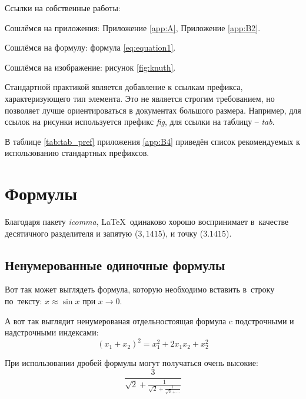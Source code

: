%

Ссылки на собственные работы:~\cite{vakbib1, confbib1}

Сошлёмся на приложения: Приложение \ref{app:A}, Приложение \ref{app:B2}.

Сошлёмся на формулу: формула \eqref{eq:equation1}.

Сошлёмся на изображение: рисунок \ref{fig:knuth}.

Стандартной практикой является добавление к ссылкам префикса, характеризующего тип элемента.
Это не является строгим требованием, но позволяет лучше ориентироваться в документах большого размера.
Например, для ссылок на рисунки используется префикс \textit{fig},
для ссылки на таблицу -- \textit{tab}.

В таблице \ref{tab:tab_pref} приложения \ref{app:B4} приведён список рекомендуемых
к использованию стандартных префиксов.

\section{Формулы} \label{sec:ch1/sec3}

Благодаря пакету \textit{icomma}, \LaTeX~одинаково хорошо воспринимает
в~качестве десятичного разделителя и запятую ($3,1415$), и точку ($3.1415$).

\subsection{Ненумерованные одиночные формулы} \label{subsec:ch1/sec3/sub1}

Вот так может выглядеть формула, которую необходимо вставить в~строку
по~тексту: $x \approx \sin x$ при $x \to 0$.

А вот так выглядит ненумерованая отдельностоящая формула c подстрочными
и надстрочными индексами:
\[
(x_1+x_2)^2 = x_1^2 + 2 x_1 x_2 + x_2^2
\]

При использовании дробей формулы могут получаться очень высокие:
\[
  \frac{3}{\sqrt{2}+
  \displaystyle\frac{1}{\sqrt{2}+
  \displaystyle\frac{1}{\sqrt{2}+\cdots}}}
\]

